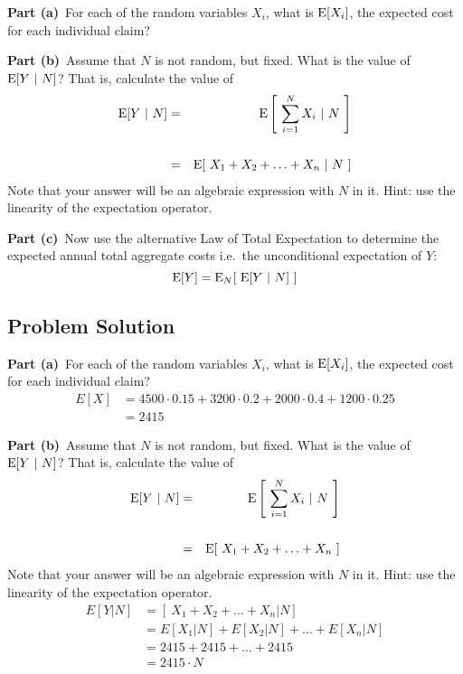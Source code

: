 \documentclass[12pt]{article}
\theoremstyle{definition}
\begin{document}
\bigskip
\noindent
{\bf Part (a)}\ For each of the random variables $X_i$, what is $\hbox{E}[X_i]$, the expected cost for each individual claim?

\bigskip
\noindent
{\bf Part (b)}\ Assume that $N$ is not random, but fixed. What is the value of $\hbox{E}[Y\ |\ N]$? That is, calculate the value of 
\begin{eqnarray*}
\hbox{E}[ Y\ |\ N] & = & \hbox{E} \left [\ \sum_{i=1}^N X_i\ |\ N\ \right ]\\
\\
& = & \hbox{E}[\ X_1 + X_2 + \ldots + X_n\ |\ N\ ]
\end{eqnarray*}
Note that your answer will be an algebraic expression with $N$ in it. Hint: use the linearity of the expectation operator.

\bigskip
\noindent
{\bf Part (c)}\ Now use the alternative Law of Total Expectation to determine the expected annual total aggregate costs i.e.\ the unconditional expectation of $Y$:
$$
\hbox{E}[ Y ] = \hbox{E}_N[\ \hbox{E}[ Y\ |\ N]\ ]
$$

\subsection*{Problem Solution}

\bigskip
\noindent
{\bf Part (a)}\ For each of the random variables $X_i$, what is $\hbox{E}[X_i]$, the expected cost for each individual claim?
\begin{align*}
E[X] &= 4500 \cdot 0.15 + 3200 \cdot 0.2 + 2000 \cdot 0.4 + 1200 \cdot 0.25\\
&= 2415
\end{align*}

\newpage
\noindent
{\bf Part (b)}\ Assume that $N$ is not random, but fixed. What is the value of $\hbox{E}[Y\ |\ N]$? That is, calculate the value of 
\begin{eqnarray*}
	\hbox{E}[ Y\ |\ N] & = & \hbox{E} \left [\ \sum_{i=1}^N X_i\ |\ N\ \right ]\\
	\\
	& = & \hbox{E}[\ X_1 + X_2 + \ldots + X_n\ ]
\end{eqnarray*}
Note that your answer will be an algebraic expression with $N$ in it. Hint: use the linearity of the expectation operator.
\begin{align*}
E[Y|N] &= [\ X_1 + X_2 + \ldots + X_n |N]\\
&= E[X_1|N] + E[X_2|N] +\ldots + E[X_n|N]\\
&= 2415 + 2415 +\ldots + 2415\\
&= 2415\cdot N
\end{align*}
\end{document}
